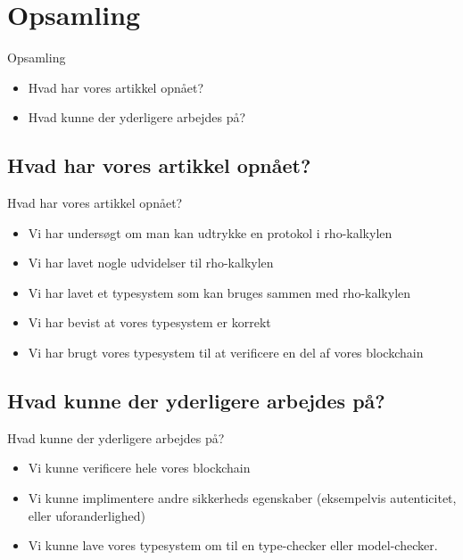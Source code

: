 \section{Opsamling}
\begin{frame}{Opsamling}
  \begin{itemize}
    \item Hvad har vores artikkel opnået?
    \item Hvad kunne der yderligere arbejdes på?
  \end{itemize}
\end{frame}

\subsection{Hvad har vores artikkel opnået?}
\begin{frame}{Hvad har vores artikkel opnået?}
  \begin{itemize}
    \item Vi har undersøgt om man kan udtrykke en protokol i rho-kalkylen
    \item Vi har lavet nogle udvidelser til rho-kalkylen
    \item Vi har lavet et typesystem som kan bruges sammen med rho-kalkylen
    \item Vi har bevist at vores typesystem er korrekt
    \item Vi har brugt vores typesystem til at verificere en del af vores blockchain
  \end{itemize}
\end{frame}


\subsection{Hvad kunne der yderligere arbejdes på?}
\begin{frame}{Hvad kunne der yderligere arbejdes på?}
  \begin{itemize}
    \item  Vi kunne verificere hele vores blockchain
    \item Vi kunne implimentere andre sikkerheds egenskaber (eksempelvis autenticitet, eller uforanderlighed)
    \item Vi kunne lave vores typesystem om til en type-checker eller model-checker.
  \end{itemize}
\end{frame}
